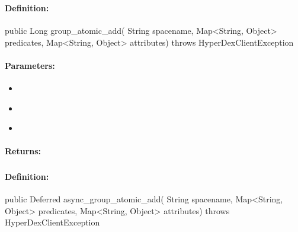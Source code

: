 \pagebreak
\subsubsection{}
\label{api:java:group_atomic_add}


\paragraph{Definition:}
\begin{javacode}
public Long group_atomic_add(
        String spacename,
        Map<String, Object> predicates,
        Map<String, Object> attributes) throws HyperDexClientException
\end{javacode}

\paragraph{Parameters:}
\begin{itemize}[noitemsep]
\item {}\\

\item {}\\

\item {}\\

\end{itemize}

\paragraph{Returns:}


\pagebreak
\subsubsection{}
\label{api:java:async_group_atomic_add}


\paragraph{Definition:}
\begin{javacode}
public Deferred async_group_atomic_add(
        String spacename,
        Map<String, Object> predicates,
        Map<String, Object> attributes) throws HyperDexClientException
\end{javacode}

